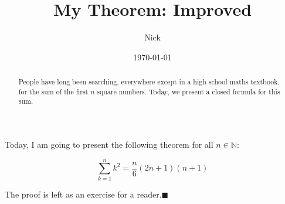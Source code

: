 \documentclass{article}
\title{My Theorem: Improved}
\author{Nick}
\date{\today}
\begin{document}
\maketitle

\begin{abstract}
    People have long been searching, everywhere except in a high school maths textbook, for the sum of the first $n$ square numbers. Today, we present a closed formula for this sum.
\end{abstract}

Today, I am going to present the following theorem for all $n\in\mathbb{N}$:

\[
    \sum^n_{k=1}k^2=\frac{n}{6}(2n+1)(n+1)
\]

The proof is left as an exercise for a reader.\hfill$\blacksquare$
\end{document}

